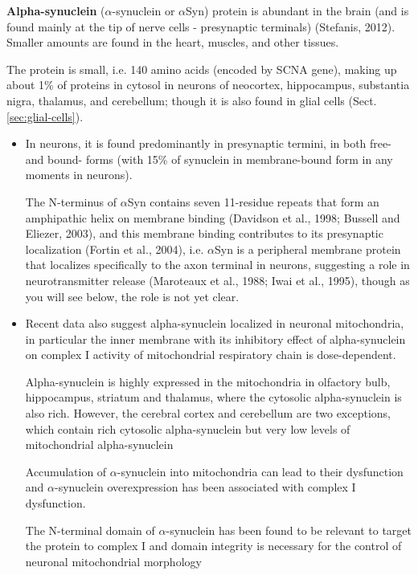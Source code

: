 {\bf Alpha-synuclein} ($\alpha$-synuclein or $\alpha$Syn) protein is abundant in
the brain (and is found mainly at the tip of nerve cells - presynaptic
terminals) (Stefanis, 2012). Smaller amounts are found in the heart, muscles,
and other tissues.


The protein is small, i.e. 140 amino acids (encoded by SCNA gene), making up
about 1\% of proteins in cytosol in neurons of neocortex, hippocampus,
substantia nigra, thalamus, and cerebellum; though it is also found in glial
cells (Sect.\ref{sec:glial-cells}).

\begin{itemize}
  
  \item  In neurons, it is found predominantly in presynaptic termini, in both
  free- and bound- forms (with 15\% of synuclein in membrane-bound form in any
  moments in neurons).
  
  
  The N-terminus of $\alpha$Syn contains seven 11-residue repeats that form an
  amphipathic helix on membrane binding (Davidson et al., 1998; Bussell and
  Eliezer, 2003), and this membrane binding contributes to its presynaptic
  localization (Fortin et al., 2004), i.e.  $\alpha$Syn is a peripheral membrane
  protein that localizes specifically to the axon terminal in neurons,
  suggesting a role in neurotransmitter release (Maroteaux et al., 1988; Iwai et
  al., 1995), though as you will see below, the role is not yet clear.
  

  \item Recent data also suggest alpha-synuclein localized in neuronal
  mitochondria, in particular the inner membrane with its  inhibitory effect of
  alpha-synuclein on complex I activity of mitochondrial respiratory chain is
  dose-dependent.
  
Alpha-synuclein is highly expressed in the mitochondria in olfactory bulb,
hippocampus, striatum and thalamus, where the cytosolic alpha-synuclein is also
rich. However, the cerebral cortex and cerebellum are two exceptions, which
contain rich cytosolic alpha-synuclein but very low levels of mitochondrial
alpha-synuclein


Accumulation of $\alpha$-synuclein into mitochondria can lead to their dysfunction and
$\alpha$-synuclein overexpression has been associated with complex I dysfunction.

The N-terminal domain of $\alpha$-synuclein has been found to be relevant to target the
protein to complex I  and domain integrity is necessary for the control of
neuronal mitochondrial morphology


\end{itemize}
